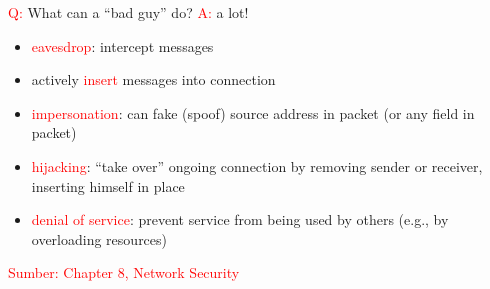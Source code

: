 \documentclass{article}
\begin{document}

\textcolor{red}{Q:} What can a ``bad guy'' do?
\textcolor{red}{A:} a lot!
\begin{itemize}
    \item \textcolor{red}{eavesdrop}: intercept messages
    \item actively \textcolor{red}{insert} messages into connection
    \item \textcolor{red}{impersonation}: can fake (spoof) source address in packet (or any field in packet)
    \item \textcolor{red}{hijacking}: ``take over'' ongoing connection by removing sender or receiver, inserting himself in place
    \item \textcolor{red}{denial of service}: prevent service from being used by others (e.g., by overloading resources)
\end{itemize}

\vspace{10mm}
\hfill \textcolor{red}{Sumber: Chapter 8, Network Security}
\end{document}
